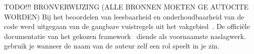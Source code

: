 TODO!!! BRONVERWIJZING (ALLE BRONNEN MOETEN GE AUTOCITE WORDEN)
Bij het beoordelen van leesbaarheid en onderhoudbaarheid van de code werd
uitgegaan van de gangbare vuistregels uit het vakgebied~\autocite{Martin2008}.
De officiële documentatie van het gekozen framework~\autocite{DockerDocs2026}
diende als voornaamste naslagwerk. \textcite{Fowler2018} gebruik je wanneer de
naam van de auteur zelf een rol speelt in je zin.

